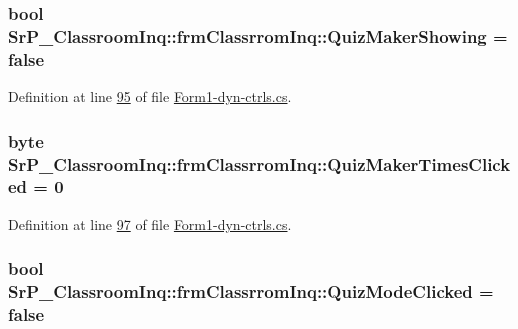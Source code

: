 \hypertarget{class_sr_p___classroom_inq_1_1frm_classrrom_inq_a527e6e32ab67073ccbdb94297399ab2d}{
\subsubsection[{\-Quiz\-Maker\-Showing}]{\setlength{\rightskip}{0pt plus 5cm}bool {\bf \-Sr\-P\-\_\-\-Classroom\-Inq\-::frm\-Classrrom\-Inq\-::\-Quiz\-Maker\-Showing} = false}}
\label{class_sr_p___classroom_inq_1_1frm_classrrom_inq_a527e6e32ab67073ccbdb94297399ab2d}


\-Definition at line \hyperlink{_form1-dyn-ctrls_8cs_source_l00095}{95} of file \hyperlink{_form1-dyn-ctrls_8cs_source}{\-Form1-\/dyn-\/ctrls.\-cs}.

\hypertarget{class_sr_p___classroom_inq_1_1frm_classrrom_inq_ae28b52f195f8e33470bb7bbc988ba622}{
\subsubsection[{\-Quiz\-Maker\-Times\-Clicked}]{\setlength{\rightskip}{0pt plus 5cm}byte {\bf \-Sr\-P\-\_\-\-Classroom\-Inq\-::frm\-Classrrom\-Inq\-::\-Quiz\-Maker\-Times\-Clicked} = 0}}
\label{class_sr_p___classroom_inq_1_1frm_classrrom_inq_ae28b52f195f8e33470bb7bbc988ba622}


\-Definition at line \hyperlink{_form1-dyn-ctrls_8cs_source_l00097}{97} of file \hyperlink{_form1-dyn-ctrls_8cs_source}{\-Form1-\/dyn-\/ctrls.\-cs}.

\hypertarget{class_sr_p___classroom_inq_1_1frm_classrrom_inq_af09c14bf56f313348d1e4a533fe515bf}{
\subsubsection[{\-Quiz\-Mode\-Clicked}]{\setlength{\rightskip}{0pt plus 5cm}bool {\bf \-Sr\-P\-\_\-\-Classroom\-Inq\-::frm\-Classrrom\-Inq\-::\-Quiz\-Mode\-Clicked} = false}}
\label{class_sr_p___classroom_inq_1_1frm_classrrom_inq_af09c14bf56f313348d1e4a533fe515bf}


